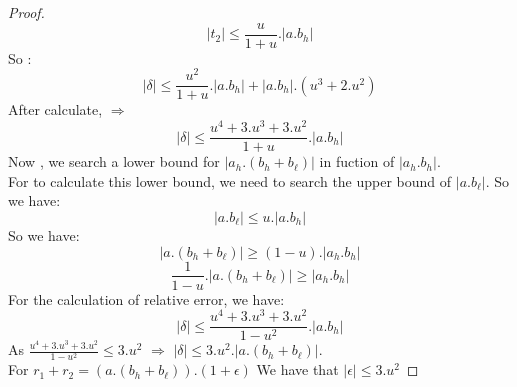 \begin{proof}
$$   \lvert t_2 \rvert  \le \frac{u}{1+u}. \lvert a.b_h \rvert $$
So :
$$ \lvert \delta \rvert \le \frac{u^2}{1+u}. \lvert a.b_h \rvert  + \lvert a.b_h \rvert .(u^3 +2.u^2) $$
After calculate,
$\Rightarrow$
$$ \lvert \delta \rvert \le \frac{u^4+3.u^3+3.u^2}{1+u}. \lvert a.b_h \rvert $$
Now , we search a lower bound for $\lvert a_h .(b_h + b_{\ell}) \rvert $ in fuction of  $\lvert a_h.b_h \rvert $.\\
For to calculate this lower bound, we need to search the upper bound of $\lvert a.b_{\ell}\rvert$. So we have:
$$\lvert a.b_{\ell}  \rvert \le u.\lvert a.b_h \rvert$$
So we have:
$$\lvert a.(b_h + b_{\ell}) \rvert \ge (1 - u).\lvert a_h.b_h \rvert  $$
$$\frac{1}{1 - u}.\lvert a.(b_h + b_{\ell}) \rvert \ge \lvert a_h.b_h \rvert  $$
For the calculation of relative error, we have:
$$ \lvert \delta \rvert \le  \frac{u^4+3.u^3+3.u^2}{1-u^2} . \lvert a.b_h \rvert $$
As $\frac{u^4+3.u^3+3.u^2}{1-u^2} \le 3.u^2$
$\Rightarrow$ $\lvert \delta \rvert \le  3.u^2.\lvert a.(b_h + b_{\ell}) \lvert $.\\
For $r_1+r_2 = (a. (b_h+b_{\ell})).(1+\epsilon)$
We have that $\lvert \epsilon \rvert \le 3.u^2$
\end{proof}